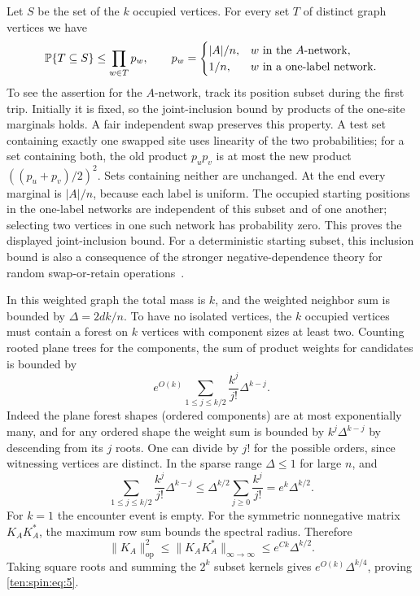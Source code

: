 Let $S$ be the set of the $k$ occupied vertices. For every set $T$
of distinct graph vertices we have
\[
 \mathbb P\{T\subseteq S\}\le\prod_{w\in T}p_w,
 \qquad
 p_w=\begin{cases}|A|/n,&w\text{ in the }A\text{-network},\\
                  1/n,&w\text{ in a one-label network}.
       \end{cases}
\]
To see the assertion for the $A$-network, track its position subset
during the first trip. Initially it is fixed, so the joint-inclusion
bound by products of the one-site marginals holds. A fair independent
swap preserves this property. A test set containing exactly one
swapped site uses linearity of the two probabilities; for a set
containing both, the old product $p_up_v$ is at most the new product
$((p_u+p_v)/2)^2$. Sets containing neither are unchanged.
At the end every marginal is $|A|/n$, because each label is uniform.
The occupied starting positions in the one-label networks are
independent of this subset and of one another; selecting two vertices
in one such network has probability zero. This proves the displayed
joint-inclusion bound.
For a deterministic starting subset, this inclusion bound is also a
consequence of the stronger negative-dependence theory for random
swap-or-retain operations~\cite[Theorems~4.20 and~4.9]{BorceaBrandenLiggett2009}.

In this weighted graph the total mass is \(k\), and the weighted neighbor sum is bounded by \(\Delta=2dk/n\). To have no isolated vertices, the \(k\) occupied vertices must contain a forest on \(k\) vertices with component sizes at least two. Counting rooted plane trees for the components, the sum of product weights for candidates is bounded by
\[
 e^{O(k)}\sum_{1\le j\le k/2}\frac{k^j}{j!}\Delta^{k-j}.
\]
Indeed the plane forest shapes (ordered components) are at most exponentially many, and for any ordered shape the weight sum is bounded by \(k^j\Delta^{k-j}\) by descending from its \(j\) roots. One can divide by \(j!\) for the possible orders, since witnessing vertices are distinct. In the sparse range $\Delta\le1$ for large $n$, and
\[
 \sum_{1\le j\le k/2}\frac{k^j}{j!}\Delta^{k-j}
 \le\Delta^{k/2}\sum_{j\ge0}\frac{k^j}{j!}
 =e^k\Delta^{k/2}.
\]
For $k=1$ the encounter event is empty. For the symmetric nonnegative matrix $K_AK_A^*$, the maximum row
sum bounds the spectral radius. Therefore
\[
 \|K_A\|_{\mathrm{op}}^2
 \le\|K_AK_A^*\|_{\infty\to\infty}
 \le e^{Ck}\Delta^{k/2}.
\]
Taking square roots and summing the $2^k$ subset kernels gives
$e^{O(k)}\Delta^{k/4}$, proving \eqref{ten:spin:eq:5}.

